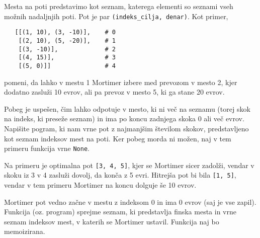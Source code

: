 \documentclass[arhiv]{../izpit}
\begin{document}
Mesta na poti predstavimo kot seznam, katerega elementi so seznami vseh možnih nadaljnjih poti. Pot je par \verb|(indeks_cilja, denar)|. Kot primer,
\begin{verbatim}
   [[(1, 10), (3, -10)],    # 0
    [(2, 10), (5, -20)],    # 1
    [(3, -10)],             # 2
    [(4, 15)],              # 3
    [(5, 0)]]               # 4
\end{verbatim}
pomeni, da lahko v mestu 1 Mortimer izbere med prevozom v mesto 2, kjer dodatno zasluži 10 evrov, ali pa prevoz v mesto 5, ki ga stane 20 evrov.

Pobeg je uspešen, čim lahko odpotuje v mesto, ki ni več na seznamu (torej skok na indeks, ki preseže seznam) in ima po koncu zadnjega skoka 0 ali več evrov. Napišite pogram, ki nam vrne pot z najmanjšim številom skokov, predstavljeno kot seznam indeksov mest na poti. Ker pobeg morda ni možen, naj v tem primeru funkcija vrne \verb|None|.

Na primeru je optimalna pot \verb|[3, 4, 5]|, kjer se Mortimer sicer zadolži, vendar v skoku iz 3 v 4 zasluži dovolj, da konča z 5 evri. Hitrejša pot bi bila \verb|[1, 5]|, vendar v tem primeru Mortimer na koncu dolguje še 10 evrov.

Mortimer pot vedno začne v mestu z indeksom 0 in ima 0 evrov (saj je vse zapil). Funkcija (oz. program) sprejme seznam, ki predstavlja finska mesta in vrne seznam indeksov mest, v katerih se Mortimer ustavil. Funkcija naj bo memoizirana.
\end{document}
